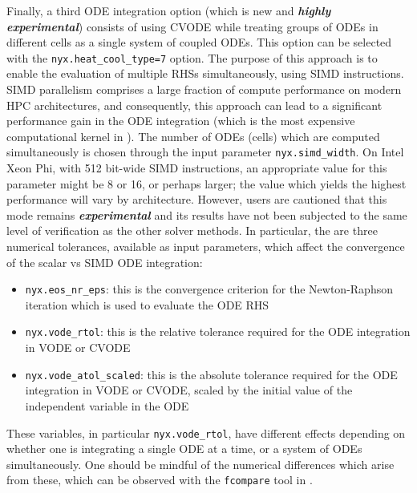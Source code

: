 Finally, a third ODE integration option (which is new and \emph{\textbf{highly experimental}}) consists of using CVODE while treating groups of ODEs in different cells as a single system of coupled ODEs.
This option can be selected with the \texttt{nyx.heat\_cool\_type=7} option.
The purpose of this approach is to enable the evaluation of multiple RHSs simultaneously, using SIMD instructions.
SIMD parallelism comprises a large fraction of compute performance on modern HPC architectures, and consequently, this approach can lead to a significant performance gain in the ODE integration (which is the most expensive computational kernel in \nyx).
The number of ODEs (cells) which are computed simultaneously is chosen through the input parameter \texttt{nyx.simd\_width}.
On Intel Xeon Phi, with 512 bit-wide SIMD instructions, an appropriate value for this parameter might be 8 or 16, or perhaps larger; the value which yields the highest performance will vary by architecture.
However, users are cautioned that this mode remains \emph{\textbf{experimental}} and its results have not been subjected to the same level of verification as the other solver methods.
In particular, the are three numerical tolerances, available as input parameters, which affect the convergence of the scalar vs SIMD ODE integration:

\begin{itemize}
  \item \texttt{nyx.eos\_nr\_eps}: this is the convergence criterion for the Newton-Raphson iteration which is used to evaluate the ODE RHS
  \item \texttt{nyx.vode\_rtol}: this is the relative tolerance required for the ODE integration in VODE or CVODE
  \item \texttt{nyx.vode\_atol\_scaled}: this is the absolute tolerance required for the ODE integration in VODE or CVODE, scaled by the initial value of the independent variable in the ODE
\end{itemize}

These variables, in particular \texttt{nyx.vode\_rtol}, have different effects depending on whether one is integrating a single ODE at a time, or a system of ODEs simultaneously.
One should be mindful of the numerical differences which arise from these, which can be observed with the \texttt{fcompare} tool in \amrex.

